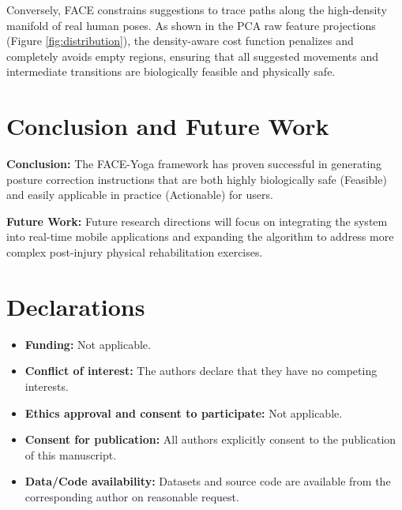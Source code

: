 \documentclass[pdflatex,sn-mathphys-num]{sn-jnl}%
\theoremstyle{thmstyleone}%
\theoremstyle{thmstyletwo}%
\theoremstyle{thmstylethree}%
\begin{document}
Conversely, FACE constrains suggestions to trace paths along the high-density manifold of real human poses. As shown in the PCA raw feature projections (Figure \ref{fig:distribution}), the density-aware cost function penalizes and completely avoids empty regions, ensuring that all suggested movements and intermediate transitions are biologically feasible and physically safe.

\section{Conclusion and Future Work}\label{sec:conclusion}

\textbf{Conclusion:} The FACE-Yoga framework has proven successful in generating posture correction instructions that are both highly biologically safe (Feasible) and easily applicable in practice (Actionable) for users. 

\textbf{Future Work:} Future research directions will focus on integrating the system into real-time mobile applications and expanding the algorithm to address more complex post-injury physical rehabilitation exercises.

\section*{Declarations}
\begin{itemize}
    \item \textbf{Funding:} Not applicable.
    \item \textbf{Conflict of interest:} The authors declare that they have no competing interests.
    \item \textbf{Ethics approval and consent to participate:} Not applicable.
    \item \textbf{Consent for publication:} All authors explicitly consent to the publication of this manuscript.
    \item \textbf{Data/Code availability:} Datasets and source code are available from the corresponding author on reasonable request.
\end{itemize}
\end{document}
